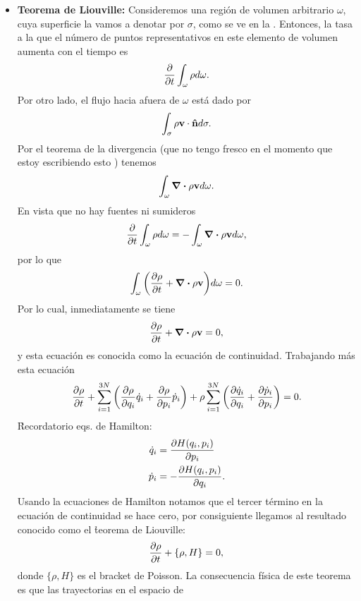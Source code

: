 \begin{itemize}
	\item \textbf{Teorema de Liouville:} Consideremos una región de
	volumen arbitrario $\omega$, cuya superficie la vamos a denotar
	por $\sigma$, como se ve en la . 
	Entonces, la tasa a la que el número de puntos 
	representativos en este elemento de volumen aumenta con 
	el tiempo es
	\begin{align}
	\pdv{t}\int_{\omega} \rho d\omega.
	\end{align}
	Por otro lado, el flujo hacia afuera de $\omega$ está dado por 
	\begin{align}
	\int _{\sigma}\rho \vb{v}\cdot \vb{\hat{n}}d\sigma.
	\end{align}
	Por el teorema de la divergencia (que no tengo fresco en el momento
	que estoy escribiendo esto ) tenemos 
	\begin{align}
	\int _\omega \div{\rho \vb{v}}d\omega.
	\end{align}
	En vista que no hay fuentes ni sumideros
	\begin{align}
	\pdv{t}\int_{\omega} \rho d\omega=-\int _\omega \div{\rho \vb{v}}d\omega,
	\end{align}
	por lo que 
	\begin{align}
	\int _{\omega}\qty(\pdv{\rho}{t}+\div{\rho\vb{v}})d\omega=0.
	\end{align}
	Por lo cual, inmediatamente se tiene 
	\begin{align}
	\pdv{\rho}{t}+\div{\rho\vb{v}}=0,
	\end{align}
	y esta ecuación es conocida como la ecuación de continuidad. 
	Trabajando más esta ecuación 
	\begin{align}
	\pdv{\rho}{t}+\sum_{i=1}^{3N}
	\qty(\pdv{\rho}{q_i}\dot{q}_i+\pdv{\rho}{p_i}\dot{p}_i)+
	\rho \sum_{i=1}^{3N}
	\qty(\pdv{\dot{q}_i}{q_i} + \pdv{\dot{p}_i}{p_i})=0.
	\end{align}
	\h{Recordatorio eqs. de Hamilton:} 
	\begin{align}
	\dot{q}_i&=\pdv{H(q_i,p_i)}{p_i}\\
	\dot{p}_i&=-\pdv{H(q_i,p_i)}{q_i}.
	\end{align}
	Usando la ecuaciones de Hamilton notamos que 
	el tercer término en la ecuación de continuidad se hace cero,
	por consiguiente llegamos al resultado 
	conocido como el \h{teorema de Liouville}:
	\begin{align}
	\pdv{\rho}{t}+\{\rho,H\}=0,
	\end{align}
	donde $\{\rho,H\}$ es el bracket de Poisson. La consecuencia 
	física de este teorema es que las trayectorias en el espacio de 

\end{itemize}
